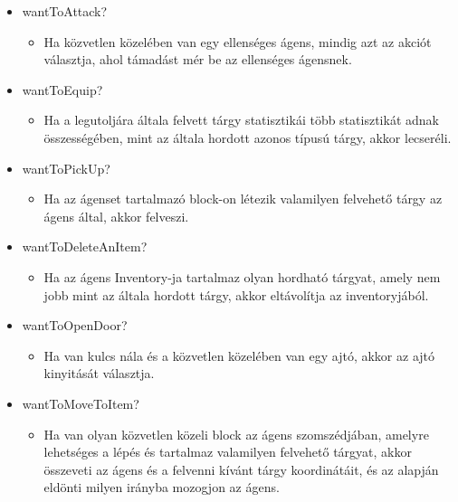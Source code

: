 \begin{itemize}
    \item wantToAttack?
    
    \begin{itemize}
        \item Ha közvetlen közelében van egy ellenséges ágens, mindig azt az akciót választja, ahol támadást mér be az ellenséges ágensnek.
    \end{itemize}

    \item wantToEquip?
    
    \begin{itemize}
        \item Ha a legutoljára általa felvett tárgy statisztikái több statisztikát adnak összességében, mint az általa hordott azonos típusú tárgy, akkor lecseréli.
    \end{itemize}

    \item wantToPickUp?
    
    \begin{itemize}
        \item Ha az ágenset tartalmazó block-on létezik valamilyen felvehető tárgy az ágens által, akkor felveszi.
    \end{itemize}

    \item wantToDeleteAnItem?
    
    \begin{itemize}
        \item Ha az ágens Inventory-ja tartalmaz olyan hordható tárgyat, amely nem jobb mint az általa hordott tárgy, akkor eltávolítja az inventoryjából.
    \end{itemize}

    \item wantToOpenDoor?
    
    \begin{itemize}
        \item Ha van kulcs nála és a közvetlen közelében van egy ajtó, akkor az ajtó kinyitását választja.
    \end{itemize}

    \item wantToMoveToItem?
    
    \begin{itemize}
        \item Ha van olyan közvetlen közeli block az ágens szomszédjában, amelyre lehetséges a lépés és tartalmaz valamilyen felvehető tárgyat,
            akkor összeveti az ágens és a felvenni kívánt tárgy koordinátáit, és az alapján eldönti milyen irányba mozogjon az ágens. 
    \end{itemize}


\end{itemize}
